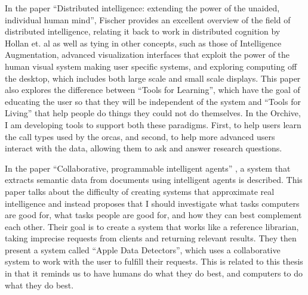 In the paper ``Distributed intelligence: extending the power of the
unaided, individual human mind'', \cite{fischer2006distributed}
Fischer provides an excellent overview of the field of distributed
intelligence, relating it back to work in distributed cognition by
Hollan et. al \cite{hollan2000distributed} as well as tying in other
concepts, such as those of Intelligence Augmentation, advanced
visualization interfaces that exploit the power of the human visual
system making user specific systems, and exploring computing off the
desktop, which includes both large scale and small scale displays.
This paper also explores the difference between ``Tools for
Learning'', which have the goal of educating the user so that they
will be independent of the system and ``Tools for Living'' that help
people do things they could not do themselves.  In the Orchive, I am
developing tools to support both these paradigms.  First, to help
users learn the call types used by the orcas, and second, to help more
advanced users interact with the data, allowing them to ask and answer
research questions.

In the paper ``Collaborative, programmable intelligent agents''
\cite{nardi1998collaborative}, a system that extracts semantic data
from documents using intelligent agents is described.  This paper
talks about the difficulty of creating systems that approximate real
intelligence and instead proposes that I should investigate what
tasks computers are good for, what tasks people are good for, and how
they can best complement each other.  Their goal is to create a system
that works like a reference librarian, taking imprecise requests from
clients and returning relevant results.  They then present a system
called ``Apple Data Detectors'', which uses a collaborative system to
work with the user to fulfill their requests.  This is related to this
thesis in that it reminds us to have humans do what they do best, and
computers to do what they do best.

